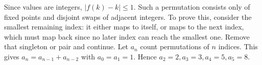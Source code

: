 Since values are integers, $|f(k)-k|\le1$. Such a permutation consists only of fixed points and disjoint swaps of adjacent integers. To prove this, consider the smallest remaining index: it either maps to itself, or maps to the next index, which must map back since no later index can reach the smallest one. Remove that singleton or pair and continue.
Let $a_n$ count permutations of $n$ indices. This gives $a_n=a_{n-1}+a_{n-2}$ with $a_0=a_1=1$. Hence $a_2=2,a_3=3,a_4=5,a_5=\boxed8$.
